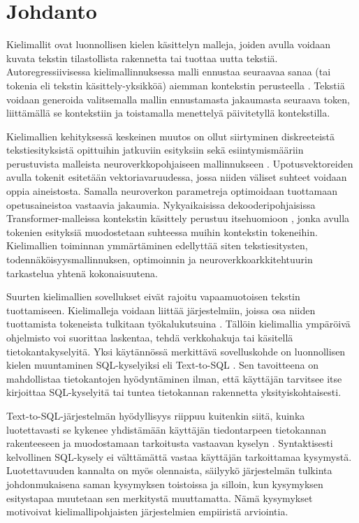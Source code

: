 \section{Johdanto}

Kielimallit ovat luonnollisen kielen käsittelyn malleja, joiden avulla
voidaan kuvata tekstin tilastollista rakennetta tai tuottaa uutta tekstiä.
Autoregressiivisessa kielimallinnuksessa malli ennustaa seuraavaa sanaa
(tai tokenia eli tekstin käsittely-yksikköä) aiemman kontekstin perusteella
\cite{jurafsky2023speech, bengio2003neural}. Tekstiä voidaan generoida
valitsemalla mallin ennustamasta jakaumasta seuraava token, liittämällä se
kontekstiin ja toistamalla menettelyä päivitetyllä kontekstilla.

Kielimallien kehityksessä keskeinen muutos on ollut siirtyminen
diskreeteistä tekstiesityksistä opittuihin jatkuviin esityksiin \cite{mikolov2013efficient} sekä
esiintymismääriin perustuvista malleista neuroverkkopohjaiseen
mallinnukseen \cite{werbos1974beyond, rumelhart1986learning}. Upotusvektoreiden avulla tokenit esitetään vektoriavaruudessa, jossa niiden väliset suhteet voidaan oppia aineistosta. Samalla neuroverkon parametreja optimoidaan tuottamaan opetusaineistoa vastaavia jakaumia. Nykyaikaisissa
dekooderipohjaisissa Transformer-malleissa kontekstin käsittely perustuu
itsehuomioon \cite{vaswani2017attention}, jonka avulla tokenien esityksiä muodostetaan suhteessa
muihin kontekstin tokeneihin. Kielimallien toiminnan ymmärtäminen edellyttää
siten tekstiesitysten, todennäköisyysmallinnuksen, optimoinnin ja
neuroverkkoarkkitehtuurin tarkastelua yhtenä kokonaisuutena.

Suurten kielimallien sovellukset eivät rajoitu vapaamuotoisen tekstin
tuottamiseen. Kielimalleja voidaan liittää järjestelmiin, joissa osa niiden
tuottamista tokeneista tulkitaan työkalukutsuina
\cite{schick2023toolformer, yao2023react}. Tällöin kielimallia ympäröivä
ohjelmisto voi suorittaa laskentaa, tehdä verkkohakuja tai käsitellä
tietokantakyselyitä. Yksi käytännössä merkittävä sovelluskohde on
luonnollisen kielen muuntaminen SQL-kyselyiksi eli Text-to-SQL
\cite{liu2024survey, deng2022recent}. Sen tavoitteena on mahdollistaa
tietokantojen hyödyntäminen ilman, että käyttäjän tarvitsee itse kirjoittaa
SQL-kyselyitä tai tuntea tietokannan rakennetta yksityiskohtaisesti.

Text-to-SQL-järjestelmän hyödyllisyys riippuu kuitenkin siitä, kuinka
luotettavasti se kykenee yhdistämään käyttäjän tiedontarpeen tietokannan
rakenteeseen ja muodostamaan tarkoitusta vastaavan kyselyn
\cite{yu2018spider, li2024bird}. Syntaktisesti kelvollinen SQL-kysely ei
välttämättä vastaa käyttäjän tarkoittamaa kysymystä. Luotettavuuden kannalta
on myös olennaista, säilyykö järjestelmän tulkinta johdonmukaisena saman
kysymyksen toistoissa ja silloin, kun kysymyksen esitystapaa muutetaan
sen merkitystä muuttamatta. Nämä kysymykset motivoivat kielimallipohjaisten
järjestelmien empiiristä arviointia.

